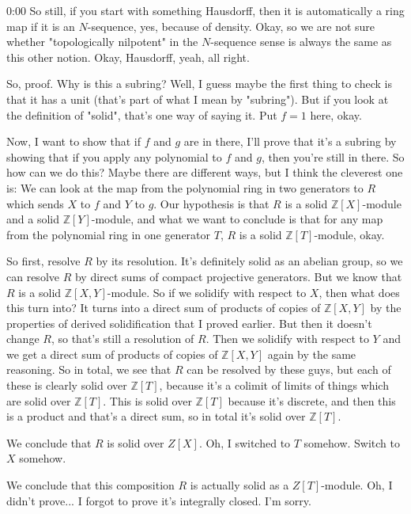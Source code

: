 \begin{unfinished}{0:00}
So still, if you start with something Hausdorff, then it is automatically a ring map if it is an $N$-sequence, yes, because of density. Okay, so we are not sure whether "topologically nilpotent" in the $N$-sequence sense is always the same as this other notion. Okay, Hausdorff, yeah, all right.

So, proof. Why is this a subring? Well, I guess maybe the first thing to check is that it has a unit (that's part of what I mean by "subring"). But if you look at the definition of "solid", that's one way of saying it. Put $f=1$ here, okay.

Now, I want to show that if $f$ and $g$ are in there, I'll prove that it's a subring by showing that if you apply any polynomial to $f$ and $g$, then you're still in there. So how can we do this? Maybe there are different ways, but I think the cleverest one is: We can look at the map from the polynomial ring in two generators to $R$ which sends $X$ to $f$ and $Y$ to $g$. Our hypothesis is that $R$ is a solid $\mathbb{Z}[X]$-module and a solid $\mathbb{Z}[Y]$-module, and what we want to conclude is that for any map from the polynomial ring in one generator $T$, $R$ is a solid $\mathbb{Z}[T]$-module, okay.

So first, resolve $R$ by its resolution. It's definitely solid as an abelian group, so we can resolve $R$ by direct sums of compact projective generators. But we know that $R$ is a solid $\mathbb{Z}[X,Y]$-module. So if we solidify with respect to $X$, then what does this turn into? It turns into a direct sum of products of copies of $\mathbb{Z}[X,Y]$ by the properties of derived solidification that I proved earlier. But then it doesn't change $R$, so that's still a resolution of $R$. Then we solidify with respect to $Y$ and we get a direct sum of products of copies of $\mathbb{Z}[X,Y]$ again by the same reasoning. So in total, we see that $R$ can be resolved by these guys, but each of these is clearly solid over $\mathbb{Z}[T]$, because it's a colimit of limits of things which are solid over $\mathbb{Z}[T]$. This is solid over $\mathbb{Z}[T]$ because it's discrete, and then this is a product and that's a direct sum, so in total it's solid over $\mathbb{Z}[T]$.

We conclude that $R$ is solid over $Z[X]$. Oh, I switched to $T$ somehow. Switch to $X$ somehow.

We conclude that this composition $R$ is actually solid as a $Z[T]$-module. Oh, I didn't prove... I forgot to prove it's integrally closed. I'm sorry.


\end{unfinished}
